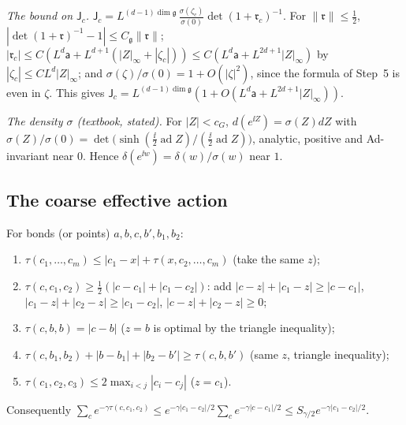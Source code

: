 \begin{detail}
\begin{step}
\end{step}
\begin{step}
\emph{The bound on $\mathsf J_c$.} $\mathsf J_c=L^{(d-1)\dim\mathfrak g}\,\frac{\sigma(\zeta_c)}{\sigma(0)}\det(1+\mathfrak r_c)^{-1}$. For $\|\mathfrak r\|\le\frac12$, $|\det(1+\mathfrak r)^{-1}-1|\le C_{\mathfrak g}\|\mathfrak r\|$; $|\mathfrak r_c|\le C(L^d\mathsf a+L^{d+1}(|Z|_\infty+|\zeta_c|))\le C(L^d\mathsf a+L^{2d+1}|Z|_\infty)$ by $|\zeta_c|\le CL^d|Z|_\infty$; and $\sigma(\zeta)/\sigma(0)=1+O(|\zeta|^2)$, since the formula of Step~5 is even in $\zeta$. This gives $\mathsf J_c=L^{(d-1)\dim\mathfrak g}(1+O(L^d\mathsf a+L^{2d+1}|Z|_\infty))$.
\end{step}
\begin{step}
\emph{The density $\sigma$ (textbook, stated).} For $|Z|<c_G$, $d(e^{\ii Z})=\sigma(Z)dZ$ with $\sigma(Z)/\sigma(0)=\det\big(\sinh(\frac{\ii}2\operatorname{ad}Z)/(\frac{\ii}2\operatorname{ad}Z)\big)$, analytic, positive and Ad-invariant near $0$. Hence $\delta(e^{\ii w})=\delta(w)/\sigma(w)$ near $1$.
\end{step}
\end{detail}

\subsection{The coarse effective action}\label{d7:coarse-sec}

\begin{detail}\label{d7:tau}
For bonds (or points) $a,b,c,b',b_1,b_2$:
\begin{enumerate}[label=(\roman*)]
\item $\tau(c_1,\dots,c_m)\le|c_1-x|+\tau(x,c_2,\dots,c_m)$ (take the same $z$);
\item $\tau(c,c_1,c_2)\ge\frac12(|c-c_1|+|c_1-c_2|)$: add $|c-z|+|c_1-z|\ge|c-c_1|$, $|c_1-z|+|c_2-z|\ge|c_1-c_2|$, $|c-z|+|c_2-z|\ge0$;
\item $\tau(c,b,b)=|c-b|$ ($z=b$ is optimal by the triangle inequality);
\item $\tau(c,b_1,b_2)+|b-b_1|+|b_2-b'|\ge\tau(c,b,b')$ (same $z$, triangle inequality);
\item $\tau(c_1,c_2,c_3)\le2\max_{i<j}|c_i-c_j|$ ($z=c_1$).
\end{enumerate}
Consequently $\sum_ce^{-\gamma\tau(c,c_1,c_2)}\le e^{-\gamma|c_1-c_2|/2}\sum_ce^{-\gamma|c-c_1|/2}\le S_{\gamma/2}e^{-\gamma|c_1-c_2|/2}$.
\end{detail}

